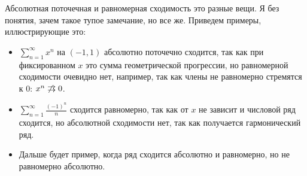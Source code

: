 \notice \; Абсолютная поточечная и равномерная сходимость это разные вещи.
Я без понятия, зачем такое тупое замечание, но все же.
Приведем примеры, иллюстрирующие это: \begin{itemize}
    \item $\sum\limits_{n = 1}^\infty x^n$ на $(-1, 1)$ абсолютно поточечно сходится, так как при фиксированном $x$ это сумма геометрической прогрессии, но равномерной сходимости очевидно нет, например, так как члены не равномерно стремятся к 0: $x^n \not \doublerightarrow 0$.
    \item $\sum\limits_{n = 1}^\infty \frac{(-1)^n}{n}$ сходится равномерно, так как от $x$ не зависит и числовой ряд сходится, но абсолютной сходимости нет, так как получается гармонический ряд.
    \item Дальше будет пример, когда ряд сходится абсолютно и равномерно, но не равномерно абсолютно.
\end{itemize}

